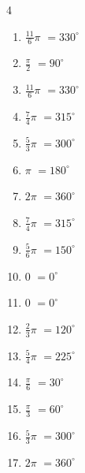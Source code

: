 \begin{multicols}{4}
\begin{enumerate}
  \item $\displaystyle \frac{11}{6}\pi$
        $\displaystyle =330^{\circ}$

  \item $\displaystyle \frac{\pi}{2}$
        $\displaystyle =90^{\circ}$

  \item $\displaystyle \frac{11}{6}\pi$
        $\displaystyle =330^{\circ}$

  \item $\displaystyle \frac{7}{4}\pi$
        $\displaystyle =315^{\circ}$

  \item $\displaystyle \frac{5}{3}\pi$
        $\displaystyle =300^{\circ}$

  \item $\displaystyle \pi$
        $\displaystyle =180^{\circ}$

  \item $\displaystyle 2\pi$
        $\displaystyle =360^{\circ}$

  \item $\displaystyle \frac{7}{4}\pi$
        $\displaystyle =315^{\circ}$

  \item $\displaystyle \frac{5}{6}\pi$
        $\displaystyle =150^{\circ}$

  \item $\displaystyle 0$
        $\displaystyle =0^{\circ}$

  \item $\displaystyle 0$
        $\displaystyle =0^{\circ}$

  \item $\displaystyle \frac{2}{3}\pi$
        $\displaystyle =120^{\circ}$

  \item $\displaystyle \frac{5}{4}\pi$
        $\displaystyle =225^{\circ}$

  \item $\displaystyle \frac{\pi}{6}$
        $\displaystyle =30^{\circ}$

  \item $\displaystyle \frac{\pi}{3}$
        $\displaystyle =60^{\circ}$

  \item $\displaystyle \frac{5}{3}\pi$
        $\displaystyle =300^{\circ}$

  \item $\displaystyle 2\pi$
        $\displaystyle =360^{\circ}$


\end{enumerate}
\end{multicols}
